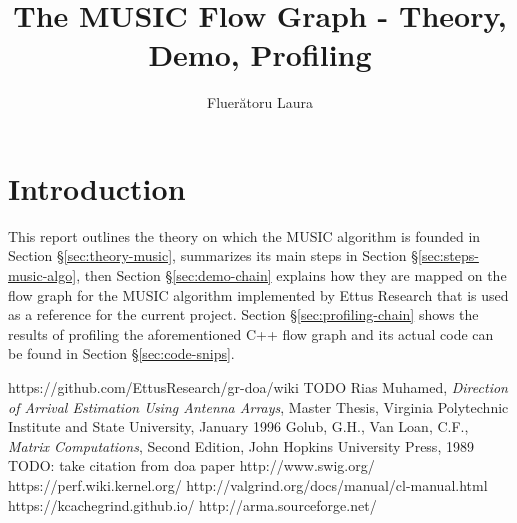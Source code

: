 \documentclass[12pt, a4paper, oneside, romanian]{article}
\begin{document}
\title{The MUSIC Flow Graph - Theory, Demo, Profiling}
\author{Fluerătoru Laura}
\date{}
\maketitle

\section{Introduction}

This report outlines the theory on which the MUSIC algorithm is founded in
Section \S\ref{sec:theory-music}, summarizes its main steps in Section
\S\ref{sec:steps-music-algo}, then Section \S\ref{sec:demo-chain} explains how
they are mapped on the flow graph for the MUSIC algorithm implemented by Ettus
Research \cite{cite:ettus-doa} that is used as a reference for the current
project.  Section \S\ref{sec:profiling-chain} shows the results of profiling the
aforementioned C++ flow graph and its actual code can be found in Section
\S\ref{sec:code-snips}.







\begin{thebibliography}{1}
     https://github.com/EttusResearch/gr-doa/wiki
     TODO
     Rias Muhamed, \textit{Direction of Arrival Estimation Using
    Antenna Arrays}, Master Thesis, Virginia Polytechnic Institute and State
    University, January 1996
     Golub, G.H., Van Loan, C.F., \textit{Matrix Computations},
    Second Edition, John Hopkins University Press, 1989
     TODO: take citation from doa paper
     http://www.swig.org/
     https://perf.wiki.kernel.org/
     http://valgrind.org/docs/manual/cl-manual.html
     https://kcachegrind.github.io/
     http://arma.sourceforge.net/
\end{thebibliography}
\end{document}
